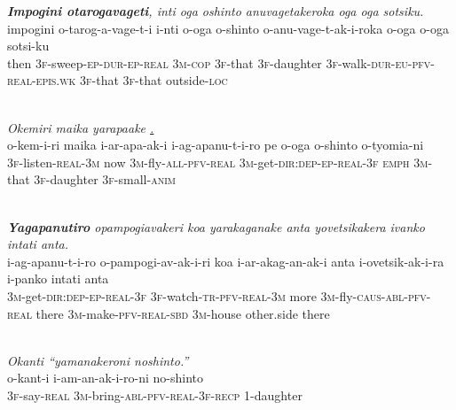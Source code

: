 \documentclass[output=paper]{LSP/langsci}
\begin{document}
\begin{exe}
\ex \label{Emapp17}
\glt \textit{\textbf{Impogini otarogavageti}, inti oga oshinto anuvagetakeroka oga oga sotsiku.}\\
\gll impogini o-tarog-a-vage-t-i i-nti o-oga o-shinto o-anu-vage-t-ak-i-roka o-oga o-oga sotsi-ku\\
 then \textsc{3f-}sweep\textsc{{}-ep-dur-ep-real} \textsc{3m-cop} \textsc{3f-}that \textsc{3f-}daughter \textsc{3f-}walk\textsc{{}-dur-eu-pfv-real-epis.wk} \textsc{3f-}that \textsc{3f-}that outside\textsc{{}-loc}\\
\glt {}\\
\end{exe}
 
\begin{exe}
\ex \label{Emapp18}
\glt \textit{Okemiri maika yarapaake \underline{.}}\\
\gll o-kem-i-ri maika i-ar-apa-ak-i i-ag-apanu-t-i-ro pe o-oga o-shinto o-tyomia-ni \\
 \textsc{3f-}listen\textsc{{}-real-3m} now \textsc{3m-}fly\textsc{{}-all-pfv-real} \textsc{3m-}get\textsc{{}-dir:dep-ep-real-3f} \textsc{emph} \textsc{3m-}that \textsc{3f-}daughter \textsc{3f-}small\textsc{{}-anim}\\
\glt {}\\
\end{exe}
 
\begin{exe}
\ex \label{Emapp19}
\glt \textit{\textbf{Yagapanutiro} opampogiavakeri koa yarakaganake anta yovetsikakera ivanko intati anta.}\\
\gll i-ag-apanu-t-i-ro o-pampogi-av-ak-i-ri koa i-ar-akag-an-ak-i anta i-ovetsik-ak-i-ra i-panko intati anta\\
 \textsc{3m-}get\textsc{{}-dir:dep-ep-real-3f} \textsc{3f-}watch\textsc{{}-tr-pfv-real-3m} more \textsc{3m-}fly\textsc{{}-caus-abl-pfv-real} there \textsc{3m-}make\textsc{{}-pfv-real-sbd} \textsc{3m-}house other.side there\\
\glt {}\\
\end{exe}
 
\begin{exe}
\ex \label{Emapp20}
\glt \textit{Okanti ``yamanakeroni noshinto.''}\\
\gll o-kant-i i-am-an-ak-i-ro-ni no-shinto\\
 \textsc{3f-}say\textsc{{}-real} \textsc{3m-}bring\textsc{{}-abl-pfv-real-3f-recp} 1-daughter\\
\glt {}\\
\end{exe}
 
\end{document}
